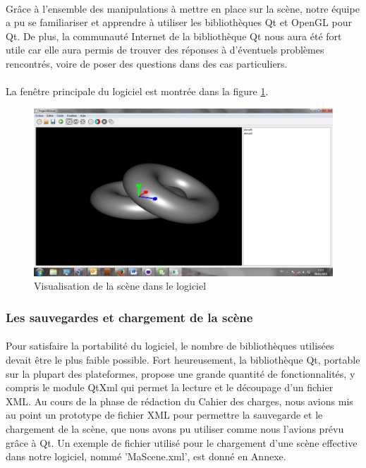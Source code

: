 \paragraph{}
Grâce à l'ensemble des manipulations à mettre en place sur la scène, notre équipe a pu se familiariser et apprendre à utiliser les bibliothèques Qt et OpenGL pour Qt. De plus, la communauté Internet de la bibliothèque Qt nous aura été fort utile car elle aura permis de trouver des réponses à d'éventuels problèmes rencontrés, voire de poser des questions dans des cas particuliers.

\paragraph{}
La fenêtre principale du logiciel est montrée dans la figure \ref{fig:screenScene}.

\begin{figure}[h]
	\centering
	\includegraphics[scale=0.4]{Scene.png}
	\caption{\label{fig:screenScene} Visualisation de la scène dans le logiciel \protect}
\end{figure}

\subsubsection{Les sauvegardes et chargement de la scène}
\paragraph{}
Pour satisfaire la portabilité du logiciel, le nombre de bibliothèques utilisées devait être le plus faible possible. Fort heureusement, la bibliothèque Qt, portable sur la plupart des plateformes, propose une grande quantité de fonctionnalités, y compris le module QtXml qui permet la lecture et le découpage d'un fichier XML. Au cours de la phase de rédaction du Cahier des charges, nous avions mis au point un prototype de fichier XML pour permettre la sauvegarde et le chargement de la scène, que nous avons pu utiliser comme nous l'avions prévu grâce à Qt. Un exemple de fichier utilisé pour le chargement d'une scène effective dans notre logiciel, nommé 'MaScene.xml', est donné en Annexe.

